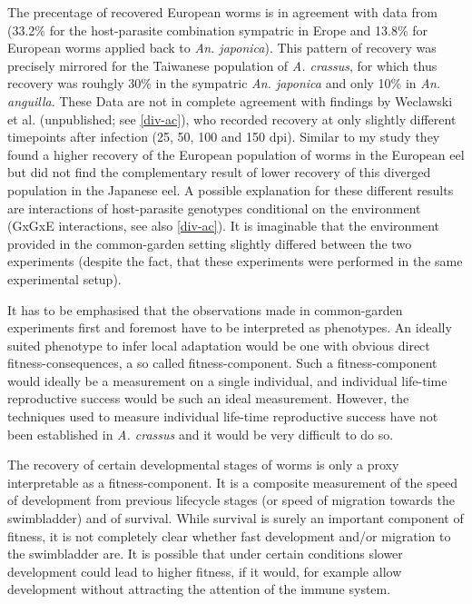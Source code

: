 The precentage of recovered European worms is in agreement with data
from \cite{knopf_differences_2004} (33.2\% for the host-parasite
combination sympatric in Erope and 13.8\% for European worms applied
back to \textit{An. japonica}). This pattern of recovery was precisely
mirrored for the Taiwanese population of \textit{A. crassus}, for
which thus recovery was rouhgly 30\% in the sympatric
\textit{An. japonica} and only 10\% in \textit{An. anguilla}. These
Data are not in complete agreement with findings by Weclawski et
al. (unpublished; see \ref{div-ac}), who recorded recovery at only
slightly different timepoints after infection (25, 50, 100 and 150
dpi). Similar to my study they found a higher recovery of the European
population of worms in the European eel but did not find the
complementary result of lower recovery of this diverged population in
the Japanese eel. A possible explanation for these different results
are interactions of host-parasite genotypes conditional on the
environment (GxGxE interactions, see also \ref{div-ac}). It is
imaginable that the environment provided in the common-garden setting
slightly differed between the two experiments (despite the fact, that
these experiments were performed in the same experimental setup).

It has to be emphasised that the observations made in common-garden
experiments first and foremost have to be interpreted as
phenotypes. An ideally suited phenotype to infer local adaptation
would be one with obvious direct fitness-consequences, a so called
fitness-component. Such a fitness-component would ideally be a
measurement on a single individual, and individual life-time
reproductive success would be such an ideal measurement. However, the
techniques used to measure individual life-time reproductive success
have not been established in \textit{A. crassus} and it would be very
difficult to do so.

The recovery of certain developmental stages of worms is only a proxy
interpretable as a fitness-component. It is a composite measurement of
the speed of development from previous lifecycle stages (or speed of
migration towards the swimbladder) and of survival. While survival is
surely an important component of fitness, it is not completely clear
whether fast development and/or migration to the swimbladder are. It
is possible that under certain conditions slower development could
lead to higher fitness, if it would, for example allow development
without attracting the attention of the immune system.

